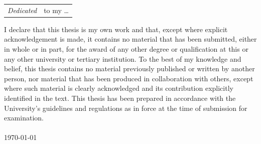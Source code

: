 \cleardoublepage
\thispagestyle{empty}
\vspace*{\fill}

\begin{flushleft}
\begin{tabular}{@{}l p{}@{}}
\textit{Dedicated} & to my \dots

\end{tabular}
\end{flushleft}

\vspace*{\fill}
\cleardoublepage


\small 

\lipsum[1]

\newpage


I declare that this thesis is my own work and that, except where explicit acknowledgement is made, it contains no material that has been submitted, either in whole or in part, for the award of any other degree or qualification at this or any other university or tertiary institution.
%
To the best of my knowledge and belief, this thesis contains no material previously published or written by another person, nor material that has been produced in collaboration with others, except where such material is clearly acknowledged and its contribution explicitly identified in the text.
%
This thesis has been prepared in accordance with the University’s guidelines and regulations as in force at the time of submission for examination.\\[1cm]

\noindent \textbf{\AuthorName}\\
\noindent \today


\lipsum[1]


